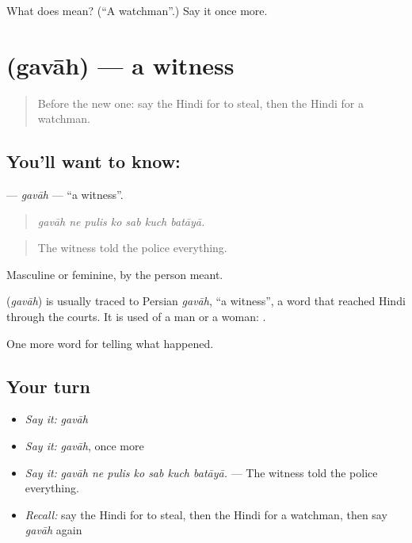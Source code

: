 \begin{tcolorbox}[breakable,colback=teal!4,colframe=teal!35!black,title={Before you move on}]
What does  mean? (\textquotedblleft{}A watchman\textquotedblright{}.) Say it once more.
\end{tcolorbox}
\section[\texorpdfstring{\hi{गवाह} (gavāh)}{गवाह (gavāh)}]{ (gavāh) — a witness}

\label{lesson:HI-C288-gavah}



\begin{quote}
Before the new one: say the Hindi for to steal, then the Hindi for a watchman.
\end{quote}

\subsection*{You'll want to know: }
\textbf{} — \emph{gavāh} — \textquotedblleft{}a witness\textquotedblright{}.

\begin{quote}
      
\end{quote}

\begin{quote}
\emph{gavāh ne pulis ko sab kuch batāyā.}
\end{quote}

\begin{quote}
The witness told the police everything.
\end{quote}

Masculine or feminine, by the person meant.

\begin{cousinweb}
\textbf{} (\emph{gavāh}) is usually traced to Persian \emph{gavāh}, \textquotedblleft{}a witness\textquotedblright{}, a word that reached Hindi through the courts. It is used of a man or a woman: \textbf{  }.
\end{cousinweb}

\begin{grammarlens}[title={What you've built}]
One more word for telling what happened.
\end{grammarlens}

\subsection*{Your turn}
\begin{itemize}
\raggedright
  \item \emph{Say it:} \emph{gavāh}
  \item \emph{Say it:} \emph{gavāh}, once more
  \item \emph{Say it:} \emph{gavāh ne pulis ko sab kuch batāyā.} — The witness told the police everything.
  \item \emph{Recall:} say the Hindi for to steal, then the Hindi for a watchman, then say \emph{gavāh} again
\end{itemize}

